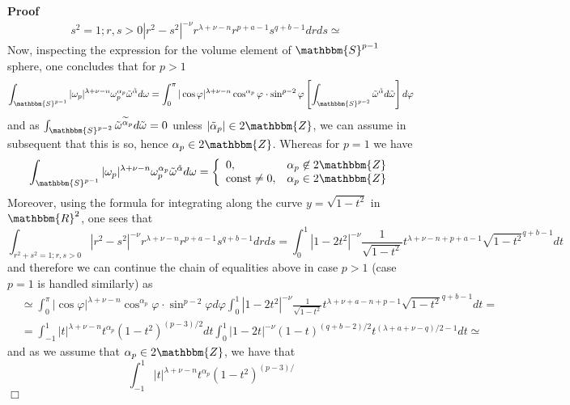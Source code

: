 \documentclass{article}
\newcommand{\nin}{\not\in}
\newcommand{\tmop}[1]{\ensuremath{\operatorname{#1}}}
\renewenvironment{proof}{\noindent\textbf{Proof\ }}{\hspace*{\fill}$\Box$\medskip}
\theoremstyle{remark}
\begin{document}
\begin{proof}
\begin{eqnarray}
{    s^2 = 1 ; r, s > 0} | r^2 - s^2 |^{- \nu} r^{\lambda + \nu - n} r^{p + a -
    1} s^{q + b - 1} d r d s \simeq &  \nonumber
  \end{eqnarray}
  Now, inspecting the expression for the volume element of $\mathbbm{S}^{p -
  1}$ sphere, one concludes that for $p > 1$
  \[ \int_{\mathbbm{S}^{p - 1}} | \omega_p |^{\lambda + \nu - n}
     \omega^{\alpha_p}_p \tilde{\omega}^{\tilde{\alpha}} d \omega =
     \int_0^{\pi} | \cos \varphi |^{\lambda + \nu - n} \cos^{\alpha_p}
     \varphi^{} \cdot \sin^{p - 2} \varphi \left[ \int_{\mathbbm{S}^{p - 2}}
     \tilde{\omega}^{\tilde{\alpha}} d \tilde{\omega} \right] d \varphi \]
  and as $\int_{\mathbbm{S}^{p - 2}} \tilde{\omega}^{\widetilde{\alpha}_p}
  d \tilde{\omega} = 0$ unless $| \tilde{\alpha}_p | \in 2\mathbbm{Z}$, we can
  assume in subsequent that this is so, hence $\alpha_p \in 2\mathbbm{Z}$.
  Whereas for $p = 1$ we have
  \[ \int_{\mathbbm{S}^{p - 1}} | \omega_p |^{\lambda + \nu - n}
     \omega^{\alpha_p}_p \tilde{\omega}^{\tilde{\alpha}} d \omega = \left\{
     \begin{array}{ll}
       0, & \alpha_p \nin 2\mathbbm{Z}\\
       \tmop{const} \neq 0, & \alpha_p \in 2\mathbbm{Z}
     \end{array} \right. \]
  Moreover, using the formula for integrating along the curve $y = \sqrt{1 -
  t^2}$ in $\mathbbm{R}^2$, one sees that
  \[ \int_{r^2 + s^2 = 1 ; r, s > 0} | r^2 - s^2 |^{- \nu} r^{\lambda + \nu -
     n} r^{p + a - 1} s^{q + b - 1} d r d s = \int_0^1 | 1 - 2 t^2 |^{- \nu}
     \frac{1}{\sqrt{1 - t^2}} t^{\lambda + \nu - n + p + a - 1} \sqrt{1 -
     t^2}^{q + b - 1} d t \]
  and therefore we can continue the chain of equalities above in case $p > 1$
  (case $p = 1$ is handled similarly) as
  \begin{eqnarray}
    & \simeq \int_0^{\pi} | \cos \varphi |^{\lambda + \nu - n}
    \cos^{\alpha_p} \varphi^{} \cdot \sin^{p - 2} \varphi d \varphi \int_0^1 |
    1 - 2 t^2 |^{- \nu} \frac{1}{\sqrt{1 - t^2}} t^{\lambda + \nu + a - n + p
    - 1} \sqrt{1 - t^2}^{q + b - 1} d t = &  \nonumber\\
    & = \int_{- 1}^1 | t |^{\lambda + \nu - n} t^{\alpha_p} (1 - t^2)^{(p -
    3) / 2} d t \int_0^1 | 1 - 2 t |^{- \nu} (1 - t)^{(q + b - 2) / 2}
    t^{(\lambda + a + \nu - q) / 2 - 1} d t \simeq &  \nonumber
  \end{eqnarray}
  and as we assume that $\alpha_p \in 2\mathbbm{Z}$, we have that
  \[ \int_{- 1}^1 | t |^{\lambda + \nu - n} t^{\alpha_p} (1 - t^2)^{(p - 3) /
}\]
\end{proof}
\end{document}
